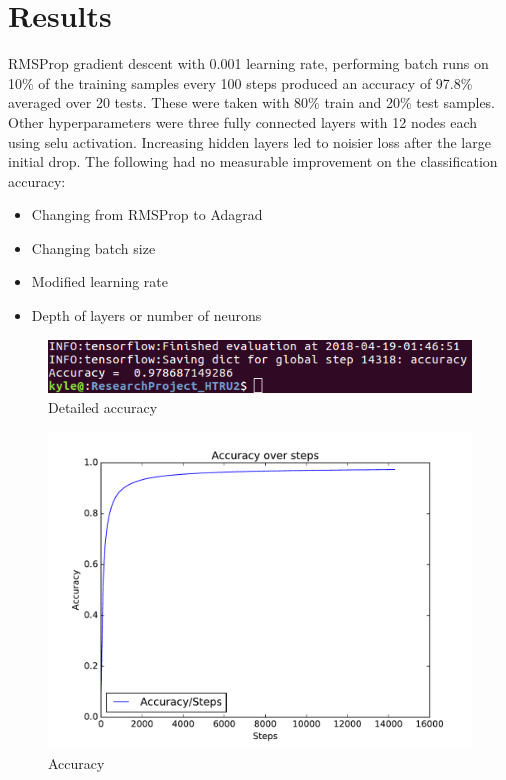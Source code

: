 \documentclass{article}
\begin{document}
\section{Results}\label{sec:results}
    RMSProp gradient descent with 0.001 learning rate, performing batch runs on 
    10\% of the training samples every 100 steps produced an accuracy of 97.8\% 
    averaged over 20 tests. These were taken with 80\% train and 20\% test 
    samples. Other hyperparameters were three fully connected layers with 12 
    nodes each using selu activation. Increasing hidden layers led to noisier 
    loss after the large initial drop. The following had no measurable 
    improvement on the classification accuracy:
    \begin{itemize}
        \item Changing from RMSProp to Adagrad
        \item Changing batch size
        \item Modified learning rate
        \item Depth of layers or number of neurons
    \end{itemize}
    \begin{figure}[H]  
    \begin{center}
    \includegraphics[scale=0.735]{images/accuracy_percent_small}
    \caption{Detailed accuracy}\label{img:term_acc}
    \end{center}
    \end{figure}
    \begin{figure}[H]  
    \begin{center}
    \includegraphics[scale=0.75]{images/Accuracy}
    \caption{Accuracy}\label{img:accuracy}
    \end{center}
    \end{figure}
\end{document}
